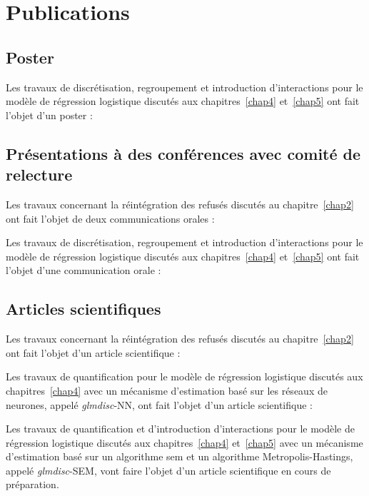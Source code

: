 \chapter{Publications}

\section{Poster}

Les travaux de discrétisation, regroupement et introduction d'interactions pour le modèle de régression logistique discutés aux chapitres~\ref{chap4} et~\ref{chap5} ont fait l'objet d'un poster :





\section{Présentations à des conférences avec comité de relecture}

Les travaux concernant la réintégration des refusés discutés au chapitre~\ref{chap2} ont fait l'objet de deux communications orales :



Les travaux de discrétisation, regroupement et introduction d'interactions pour le modèle de régression logistique discutés aux chapitres~\ref{chap4} et~\ref{chap5} ont fait l'objet d'une communication orale :


\section{Articles scientifiques}

Les travaux concernant la réintégration des refusés discutés au chapitre~\ref{chap2} ont fait l'objet d'un article scientifique :

Les travaux de quantification pour le modèle de régression logistique discutés aux chapitres~\ref{chap4} avec un mécanisme d'estimation basé sur les réseaux de neurones, appelé \textit{glmdisc}-NN, ont fait l'objet d'un article scientifique :

\fullcite{}

Les travaux de quantification et d'introduction d'interactions pour le modèle de régression logistique discutés aux chapitres~\ref{chap4} et~\ref{chap5} avec un mécanisme d'estimation basé sur un algorithme \gls{sem} et un algorithme Metropolis-Hastings, appelé \textit{glmdisc}-SEM, vont faire l'objet d'un article scientifique en cours de préparation.

